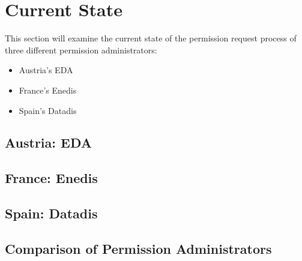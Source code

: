 \section{Current State}\label{sec:current-state}
This section will examine the current state of the permission request process of three different permission administrators:
\begin{itemize}
    \item Austria's EDA
    \item France's Enedis
    \item Spain's Datadis
\end{itemize}

\subsection{Austria: EDA}\label{subsec:austria:-eda}
\subsection{France: Enedis}\label{subsec:france:-enedis}
\subsection{Spain: Datadis}\label{subsec:spain:-datadis}
\subsection{Comparison of Permission Administrators}\label{subsec:comparison-of-permission-administrators}